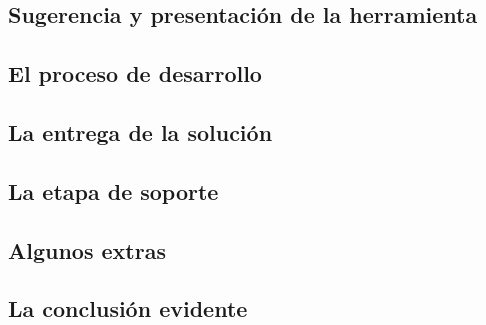 \subsection{Sugerencia y presentación de la herramienta}
  
\subsection{El proceso de desarrollo}
\subsection{La entrega de la solución}
\subsection{La etapa de soporte}
\subsection{Algunos extras}
\subsection{La conclusión evidente}
